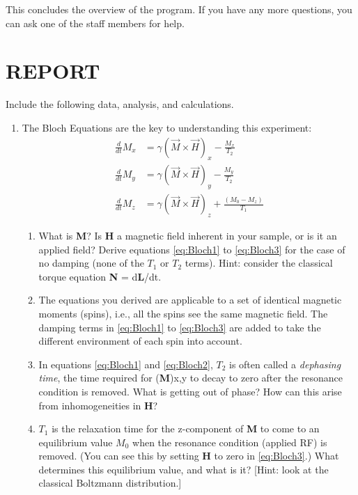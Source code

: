 \documentclass{../lab}
\begin{document}
This concludes the overview of the program. If you have any more questions, you can ask one of the staff members for help.

\section{REPORT}

Include the following data, analysis, and calculations.

\begin{enumerate}
    \item The Bloch Equations are the key to understanding this experiment:
    \begin{align}
        \label{eq:Bloch1}
        \frac{d}{dt} M_x &= \gamma (\vec{M} \times \vec{H})_x - \frac{M_x}{T_2} \\
        \label{eq:Bloch2}
        \frac{d}{dt} M_y &= \gamma (\vec{M} \times \vec{H})_y - \frac{M_y}{T_2} \\
        \label{eq:Bloch3}
        \frac{d}{dt} M_z &= \gamma (\vec{M} \times \vec{H})_z + \frac{(M_0 - M_z)}{T_1} 
    \end{align}

    \begin{enumerate}
        \item What is \textbf{M}? Is\textbf{ H} a magnetic field inherent in your sample, or is it an applied field? Derive equations \eqref{eq:Bloch1} to \eqref{eq:Bloch3} for the case of no damping (none of the $T_1$ or $T_2$ terms). Hint: consider the classical torque equation \textbf{N} = d\textbf{L}/dt.

        \item The equations you derived are applicable to a set of identical magnetic moments (spins), i.e., all the spins see the same magnetic field. The damping terms in \eqref{eq:Bloch1} to \eqref{eq:Bloch3} are added to take the different environment of each spin into account.

        \item In equations \eqref{eq:Bloch1} and \eqref{eq:Bloch2}, $T_2$ is often called a \emph{dephasing time}, the time required for (\textbf{M})x,y to decay to zero after the resonance condition is removed. What is getting out of phase? How can this arise from inhomogeneities in \textbf{H}?

        \item $T_1$ is the relaxation time for the z-component of \textbf{M} to come to an equilibrium value $M_0$ when the resonance condition (applied RF) is removed. (You can see this by setting \textbf{H} to zero in \eqref{eq:Bloch3}.) What determines this equilibrium value, and what is it? [Hint: look at the classical Boltzmann distribution.]


\end{enumerate}
\end{enumerate}
\end{document}
